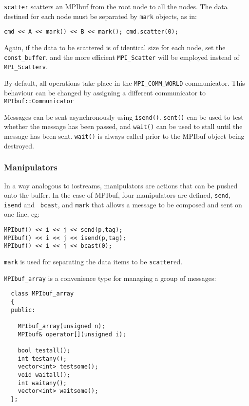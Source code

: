 {\tt scatter} scatters an MPIbuf from the root node to
all the nodes. The data destined for each node must be separated by
{\tt mark} objects, as in:
\begin{verbatim}
cmd << A << mark() << B << mark(); cmd.scatter(0);
\end{verbatim}
Again, if the data to be scattered is of identical size for each node,
set the  {\tt const\_buffer}, and the more
efficient {\tt MPI\_Scatter} will be employed instead of {\tt MPI\_Scatterv}.

By default, all operations take place in the \verb+MPI_COMM_WORLD+
communicator. This behaviour can be changed by assigning a different
communicator to \verb+MPIbuf::Communicator+

Messages can be sent asynchronously using
\verb+isend()+. \verb+sent()+ can be used to test whether the message
has been passed, and \verb+wait()+ can be used to stall until the
message has been sent. \verb+wait()+ is always called prior to the MPIbuf
object being destroyed.

\subsubsection{Manipulators}

In a way analogous to iostreams, manipulators are actions that can be
pushed onto the buffer. In the case of MPIbuf, four manipulators are
defined, {\tt send}, {\tt isend} and {\tt
  bcast}, and {\tt mark} that allows a
message to be composed and sent on one line, eg:
\begin{verbatim}
MPIbuf() << i << j << send(p,tag);
MPIbuf() << i << j << isend(p,tag);
MPIbuf() << i << j << bcast(0);
\end{verbatim}

{\tt mark} is used for separating the data items to be {\tt scatter}ed.


\verb+MPIbuf_array+ is a convenience type for managing a group of
messages:
\begin{verbatim}
  class MPIbuf_array
  {
  public:
    
    MPIbuf_array(unsigned n);
    MPIbuf& operator[](unsigned i);

    bool testall();
    int testany();
    vector<int> testsome();
    void waitall();
    int waitany();
    vector<int> waitsome();
  };
\end{verbatim}

